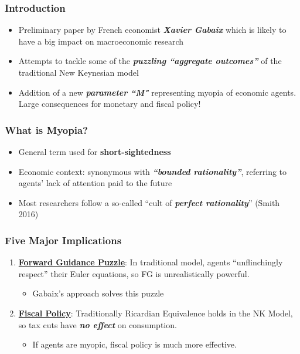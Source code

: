 \documentclass{beamer}
\begin{document}
\begin{frame}
	\frametitle{Introduction}
	\begin{itemize}
		\item Preliminary paper by French economist \textit{\textbf{Xavier Gabaix}} which is likely to have a big impact on macroeconomic research
		\vspace{8pt}
		\item Attempts to tackle some of the \textit{\textbf{puzzling ``aggregate outcomes''}} of the traditional New Keynesian model
		\vspace{8pt}
		\item Addition of a new \textit{\textbf{parameter ``M"}} representing myopia of economic agents. Large consequences for monetary and fiscal policy!
	\end{itemize}
\end{frame}


\begin{frame}
	\frametitle{What is Myopia?}
	\begin{itemize}
		\item General term used for \textbf{short-sightedness}
		\vspace{8pt}
		\item Economic context: synonymous with \textit{\textbf{``bounded rationality''}}, referring to agents' lack of attention paid to the future 
		\vspace{8pt}
		\item Most researchers follow a so-called ``cult of \textit{\textbf{perfect rationality}}'' (Smith 2016)
	\end{itemize}
\end{frame}


\begin{frame}
	\frametitle{Five Major Implications}
	\begin{enumerate}
		\item \textbf{\underline{Forward Guidance Puzzle}}: In traditional model, agents ``unflinchingly respect'' their Euler equations, so FG is unrealistically powerful.
			\begin{itemize}
				\item Gabaix's approach solves this puzzle
			\end{itemize}
		\vspace{15pt}
		\item \textbf{\underline{Fiscal Policy}}: Traditionally Ricardian Equivalence holds in the NK Model, so tax cuts have \textit{\textbf{no effect}} on consumption.
			\begin{itemize}
				\item If agents are myopic, fiscal policy is much more effective.
			\end{itemize}
	\end{enumerate}
\end{frame}
\end{document}
